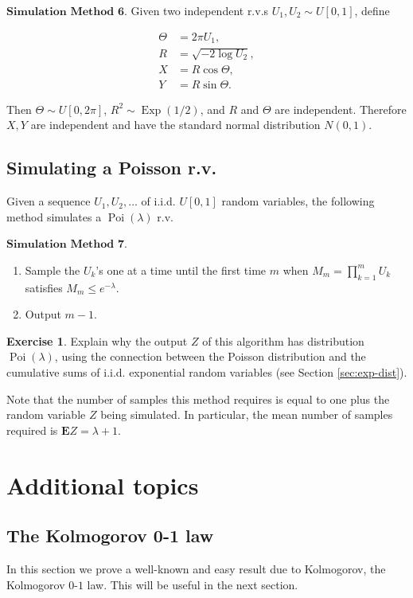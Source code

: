 \documentclass[11pt]{report}
\theoremstyle{plain}
\theoremstyle{definition}
\newtheorem{xexercise}[thm]{Exercise}
\begin{document}
$\textbf{Simulation Method 6.}$ Given two independent
r.v.s $U_1,U_2 \sim U[0,1]$, define

\begin{align*}
\Theta &= 2\pi U_1, \\
R &= \sqrt{-2 \log U_2}, \\
X &= R\cos \Theta, \\
Y &= R \sin \Theta.
\end{align*}

Then $\Theta \sim U[0,2\pi]$,
$R^2 \sim \operatorname{Exp}(1/2)$, and $R$ and
$\Theta$ are independent. Therefore $X,Y$ are
independent and have the standard normal distribution
$N(0,1)$.

\section{Simulating a Poisson r.v.}
Given a sequence $U_1,U_2,\ldots$ of i.i.d. $U[0,1]$
random variables, the following method simulates a
$\operatorname{Poi}(\lambda)$ r.v.

$\textbf{Simulation Method 7.}$

\begin{enumerate}[label=\arabic*.]
\item Sample the $U_k$'s one at a time until the first time
$m$ when $M_m =\prod_{k=1}^m U_k$ satisfies
$M_m \le e^{-\lambda}$.

\item Output $m-1$.
\end{enumerate}

\begin{xexercise}
Explain why the output $Z$ of this algorithm has
distribution $\operatorname{Poi}(\lambda)$, using the
connection between the Poisson distribution and the
cumulative sums of i.i.d. exponential random variables
(see Section \ref{sec:exp-dist}).
\end{xexercise}

Note that the number of samples this method requires
is equal to one plus the random variable $Z$ being
simulated. In particular, the mean number of samples
required is $\mathbf{E} Z = \lambda+1$.

\chapter{Additional topics}

\section{The Kolmogorov 0-1 law}
In this section we prove a well-known and easy result
due to Kolmogorov, the Kolmogorov $0$-$1$ law. This
will be useful in the next section.
\end{document}

